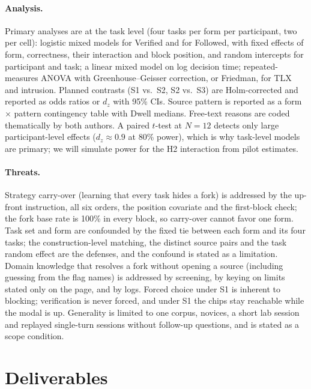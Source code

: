 \documentclass[sigconf,nonacm]{acmart}
\begin{document}
\paragraph{Analysis.}
Primary analyses are at the task level (four tasks per form per
participant, two per cell): logistic mixed models for Verified and for
Followed, with fixed effects of form, correctness, their interaction and
block position, and random intercepts for participant and task; a linear
mixed model on log decision time; repeated-measures ANOVA with
Greenhouse--Geisser correction, or Friedman, for TLX and intrusion.
Planned contrasts (S1 vs.\ S2, S2 vs.\ S3) are Holm-corrected and reported
as odds ratios or $d_z$ with 95\% CIs. Source pattern is reported as a
form $\times$ pattern contingency table with Dwell medians. Free-text
reasons are coded thematically by both authors. A paired $t$-test at
$N{=}12$ detects only large participant-level effects ($d_z \approx 0.9$
at 80\% power), which is why task-level models are primary; we will
simulate power for the H2 interaction from pilot estimates.

\paragraph{Threats.}
Strategy carry-over (learning that every task hides a fork) is addressed
by the up-front instruction, all six orders, the position covariate and
the first-block check; the fork base rate is 100\% in every block, so
carry-over cannot favor one form. Task set and form are confounded by the
fixed tie between each form and its four tasks; the construction-level
matching, the distinct source pairs and the task random effect are the
defenses, and the
confound is stated as a limitation. Domain knowledge that resolves a fork
without opening a source (including guessing from the flag names) is
addressed by screening, by keying on limits stated only on the page, and
by logs. Forced choice under S1 is inherent to blocking; verification is
never forced, and under S1 the chips stay reachable while the modal is up.
Generality is limited to one corpus, novices, a short lab session and
replayed single-turn sessions without follow-up questions, and is stated
as a scope condition.

\section{Deliverables}
\label{sec:deliverables}
\end{document}
